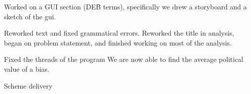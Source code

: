 Worked on a GUI section (DEB terms), specifically we drew a storyboard and a sketch of the gui.

Reworked text and fixed grammatical errors. Reworked the title in analysis, began on problem statement, and finished working on most of the analysis.

Fixed the threads of the program
We are now able to find the average political value of a bias.

Scheme delivery